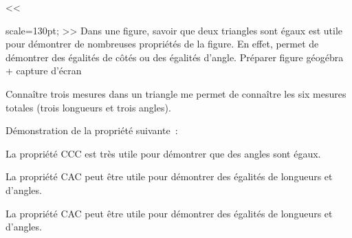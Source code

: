\documentclass{thecours}
\begin{document}
    \exported[scale=1, ]<<%
        \begin{center}
        \end{center}\vskip10pt
        \TableauRaisonnement scale=130pt;
    >>
    \newpage
    \vskip10pt
    Dans une figure, savoir que deux triangles sont égaux est utile
    pour démontrer de nombreuses propriétés de la figure. En effet,
    permet de démontrer des égalités de côtés ou des égalités d'angle.
    Préparer figure géogébra + capture d'écran
    \par{}
    Connaître trois mesures dans un triangle me permet de connaître les
    six mesures totales (trois longueurs et trois angles).\bigbreak
    \par{}
    Démonstration de la propriété suivante~:\par\medskip\noindent
    \medskip\par{}
    La propriété CCC est très utile pour démontrer que des angles sont égaux.
    \newpage
    \medskip\par{}
    La propriété CAC peut être utile pour démontrer
    des égalités de longueurs et d'angles.
    \medskip\par{}
    La propriété CAC peut être utile pour démontrer
    des égalités de longueurs et d'angles.
\end{document}
